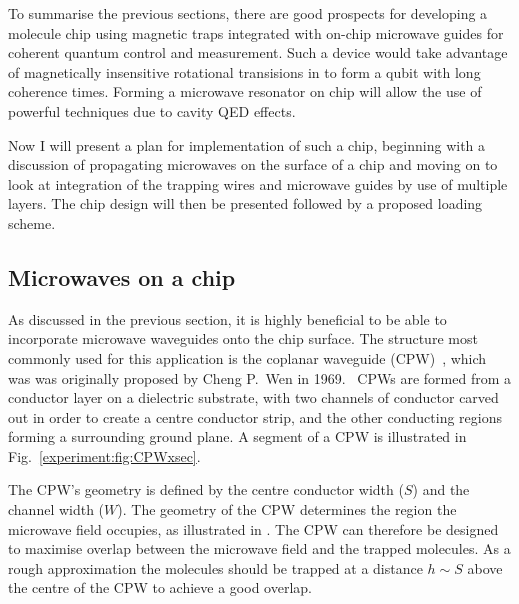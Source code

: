 To summarise the previous sections, there are good prospects for developing a
molecule chip using magnetic traps integrated with on-chip microwave guides for
coherent quantum control and measurement. Such a device would take advantage of
magnetically insensitive rotational transisions in \CaF to form a qubit with
long coherence times. Forming a microwave resonator on chip will allow the use
of powerful techniques due to cavity QED effects.


Now I will present a plan for implementation of such a chip, beginning with a
discussion of propagating microwaves on the surface of a chip and moving on to
look at integration of the trapping wires and microwave guides by use of
multiple layers. The chip design will then be presented followed by a proposed
loading scheme.

\subsection{Microwaves on a chip}

As discussed in the previous section, it is highly beneficial to be able to
incorporate microwave waveguides onto the chip surface. The structure most
commonly used for this application is the coplanar waveguide
(CPW)~\cite{1127105, Simons2004}, which was was originally proposed by Cheng
P.~Wen in 1969.~\cite{1127105} CPWs are formed from a conductor layer on a
dielectric substrate, with two channels of conductor carved out in order to
create a centre conductor strip, and the other conducting regions forming a
surrounding ground plane.  A segment of a CPW is illustrated in
Fig.~\ref{experiment:fig:CPWxsec}.

%
The CPW's geometry is defined by the centre conductor width ($S$) and the
channel width ($W$). The geometry of the CPW determines the region the microwave
field occupies, as illustrated in . The CPW
can therefore be designed to maximise overlap between the microwave field and
the trapped molecules. As a rough approximation the molecules should be trapped
at a distance $h\sim S$ above the centre of the CPW to achieve a good
overlap.~\cite{Boehi2009}

